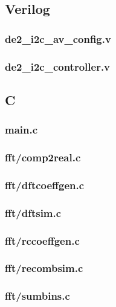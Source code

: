 \documentclass{article}
\begin{document}
\subsection{Verilog}
	\subsubsection{de2\_i2c\_av\_config.v}
	
	\subsubsection{de2\_i2c\_controller.v}
	

\subsection{C}
	\subsubsection{main.c}
	
	\subsubsection{fft/comp2real.c}
	
	\subsubsection{fft/dftcoeffgen.c}
	
	\subsubsection{fft/dftsim.c}
	
	\subsubsection{fft/rccoeffgen.c}
	
	\subsubsection{fft/recombsim.c}
	
	\subsubsection{fft/sumbins.c}
	
\end{document}
